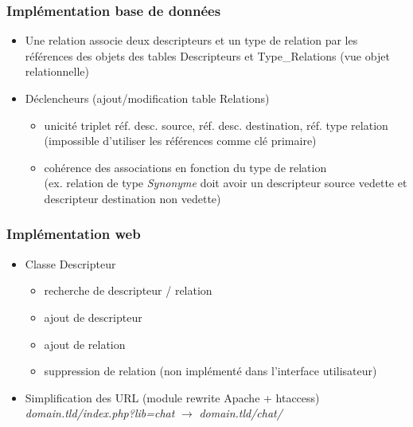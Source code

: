\documentclass{beamer}
\begin{document}
\begin{frame}
\frametitle{Implémentation base de données}
\begin{itemize}
\item Une relation associe deux descripteurs et un type de relation par les références des objets des tables Descripteurs et Type\_Relations (vue objet relationnelle)
\item Déclencheurs (ajout/modification table Relations)
\begin{itemize}
\item unicité triplet réf. desc. source, réf. desc. destination, réf. type relation (impossible d'utiliser les références comme clé primaire)
\item cohérence des associations en fonction du type de relation\\ (ex. relation de type \emph{Synonyme} doit avoir un descripteur source vedette et descripteur destination non vedette)
\end{itemize}
\end{itemize} 
\end{frame}


\begin{frame}
\frametitle{Implémentation web}
\begin{itemize}
\item Classe Descripteur
\begin{itemize}
\item recherche de descripteur / relation
\item ajout de descripteur
\item ajout de relation
\item suppression de relation (non implémenté dans l'interface utilisateur)
\end{itemize}
\item Simplification des URL (module rewrite Apache + htaccess)\\ \emph{domain.tld/index.php?lib=chat} $\rightarrow$ \emph{domain.tld/chat/}
\end{itemize}
\end{frame}
\end{document}
